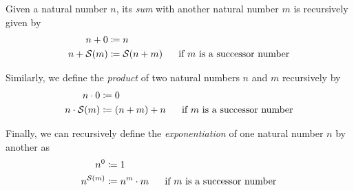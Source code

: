 \begin{definition}
    Given a natural number \(n\),
    its \emph{sum} with another natural number \(m\) is recursively given by
    \begin{align*}
        n + 0 &\defn n\\
        n + \successor{m} &\defn \successor{n + m}~~~~\text{ if } m \text{ is a successor number}
    \end{align*}

    Similarly, we define the \emph{product} of two natural numbers \(n\) and \(m\) recursively by
    \begin{align*}
        n \cdot 0 &\defn 0\\
        n \cdot \successor{m} &\defn \pn*{n + m} + n~~~~\text{ if } m \text{ is a successor number}
    \end{align*}

    Finally, we can recursively define the \emph{exponentiation} of one natural number \(n\) by another as
    \begin{align*}
        n^{0} &\defn 1\\
        n^{\successor{m}} &\defn n^{m} \cdot m~~~~\text{ if } m \text{ is a successor number}
    \end{align*}
\end{definition}

